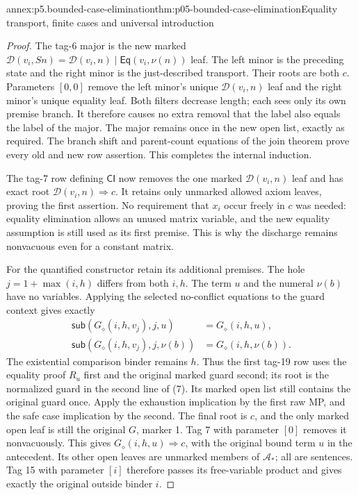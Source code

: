 \begin{annexitem}{annex:p5.bounded-case-elimination}{thm:p05-bounded-case-elimination}{Equality transport, finite cases and universal introduction}
\begin{proof}
The tag-6 major is the new marked
\(\mathcal D(v_i,Sn)=\mathcal D(v_i,n)\mathbin{|}
\mathsf{Eq}(v_i,\nu(n))\) leaf. The left minor is the preceding
state and the right minor is the just-described transport. Their roots
are both \(c\). Parameters \([0,0]\) remove the left minor's
unique \(\mathcal D(v_i,n)\) leaf and the right minor's unique
equality leaf. Both filters decrease length; each sees only its own
premise branch. It therefore causes no extra removal that the label
also equals the label of the major. The major remains once in the new
open list, exactly as required. The branch shift and parent-count
equations of the join theorem prove every old and new row assertion.
This completes the internal induction.

The tag-7 row defining \(\mathsf{CI}\) now removes the one marked
\(\mathcal D(v_i,n)\) leaf and has exact root
\(\mathcal D(v_i,n)\Rightarrow c\). It retains only unmarked
allowed axiom leaves, proving the first assertion. No requirement that
\(x_i\) occur freely in \(c\) was needed: equality elimination
allows an unused matrix variable, and the new equality assumption is
still used as its first premise. This is why the discharge remains
nonvacuous even for a constant matrix.

For the quantified constructor retain its additional premises. The hole
\(j=1+\max(i,h)\) differs from both \(i,h\). The term \(u\)
and the numeral \(\nu(b)\) have no variables. Applying the selected
no-conflict equations to the guard context gives exactly
\[
\begin{aligned}
 \mathsf{sub}(G_\diamond(i,h,v_j),j,u)&=G_\diamond(i,h,u),\\
 \mathsf{sub}(G_\diamond(i,h,v_j),j,\nu(b))
                                      &=G_\diamond(i,h,\nu(b)).
\end{aligned}
\tag{7}
\]
The existential comparison binder remains \(h\). Thus the first
tag-19 row uses the equality proof \(R_u\) first and the original
marked guard second; its root is the normalized guard in the second
line of (7). Its marked open list still contains the original guard
once. Apply the exhaustion implication by the first raw MP, and the
safe case implication by the second. The final root is \(c\), and
the only marked open leaf is still the original \(G\), marker 1.
Tag 7 with parameter \([0]\) removes it nonvacuously. This gives
\(G_\diamond(i,h,u)\Rightarrow c\), with the original bound term
\(u\) in the antecedent. Its other open leaves are unmarked members
of \(\mathcal A_*\); all are sentences. Tag 15 with parameter
\([i]\) therefore passes its free-variable product and gives exactly
the original outside binder \(i\).


\end{proof}
\end{annexitem}
